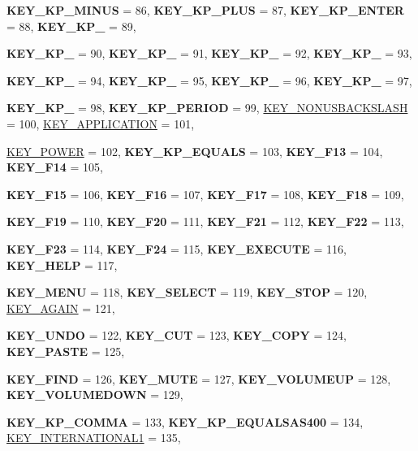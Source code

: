 \begin{DoxyCompactItemize}
{\bfseries KEY\_\-KP\_\-MINUS} =  86, 
{\bfseries KEY\_\-KP\_\-PLUS} =  87, 
{\bfseries KEY\_\-KP\_\-ENTER} =  88, 
{\bfseries KEY\_\-KP\_} =  89, 
\par
{\bfseries KEY\_\-KP\_} =  90, 
{\bfseries KEY\_\-KP\_} =  91, 
{\bfseries KEY\_\-KP\_} =  92, 
{\bfseries KEY\_\-KP\_} =  93, 
\par
{\bfseries KEY\_\-KP\_} =  94, 
{\bfseries KEY\_\-KP\_} =  95, 
{\bfseries KEY\_\-KP\_} =  96, 
{\bfseries KEY\_\-KP\_} =  97, 
\par
{\bfseries KEY\_\-KP\_} =  98, 
{\bfseries KEY\_\-KP\_\-PERIOD} =  99, 
\hyperlink{classphys_1_1MetaCode_a3e501cbb5bf0f6f1fdb7211465bda8d8a858a1c9e3bd7b047e05220da9b0a3966}{KEY\_\-NONUSBACKSLASH} =  100, 
\hyperlink{classphys_1_1MetaCode_a3e501cbb5bf0f6f1fdb7211465bda8d8a2e2aa499dcbb30b92204e9895049ad91}{KEY\_\-APPLICATION} =  101, 
\par
\hyperlink{classphys_1_1MetaCode_a3e501cbb5bf0f6f1fdb7211465bda8d8a08a2d04e3a40d746b81913e92a25a038}{KEY\_\-POWER} =  102, 
{\bfseries KEY\_\-KP\_\-EQUALS} =  103, 
{\bfseries KEY\_\-F13} =  104, 
{\bfseries KEY\_\-F14} =  105, 
\par
{\bfseries KEY\_\-F15} =  106, 
{\bfseries KEY\_\-F16} =  107, 
{\bfseries KEY\_\-F17} =  108, 
{\bfseries KEY\_\-F18} =  109, 
\par
{\bfseries KEY\_\-F19} =  110, 
{\bfseries KEY\_\-F20} =  111, 
{\bfseries KEY\_\-F21} =  112, 
{\bfseries KEY\_\-F22} =  113, 
\par
{\bfseries KEY\_\-F23} =  114, 
{\bfseries KEY\_\-F24} =  115, 
{\bfseries KEY\_\-EXECUTE} =  116, 
{\bfseries KEY\_\-HELP} =  117, 
\par
{\bfseries KEY\_\-MENU} =  118, 
{\bfseries KEY\_\-SELECT} =  119, 
{\bfseries KEY\_\-STOP} =  120, 
\hyperlink{classphys_1_1MetaCode_a3e501cbb5bf0f6f1fdb7211465bda8d8a7e4a4d24f9b7d3cb3695c9419c5aed4a}{KEY\_\-AGAIN} =  121, 
\par
{\bfseries KEY\_\-UNDO} =  122, 
{\bfseries KEY\_\-CUT} =  123, 
{\bfseries KEY\_\-COPY} =  124, 
{\bfseries KEY\_\-PASTE} =  125, 
\par
{\bfseries KEY\_\-FIND} =  126, 
{\bfseries KEY\_\-MUTE} =  127, 
{\bfseries KEY\_\-VOLUMEUP} =  128, 
{\bfseries KEY\_\-VOLUMEDOWN} =  129, 
\par
{\bfseries KEY\_\-KP\_\-COMMA} =  133, 
{\bfseries KEY\_\-KP\_\-EQUALSAS400} =  134, 
\hyperlink{classphys_1_1MetaCode_a3e501cbb5bf0f6f1fdb7211465bda8d8a47fe3fc087358b7166c1f1ce71effdc9}{KEY\_\-INTERNATIONAL1} =  135, 

\end{DoxyCompactItemize}
